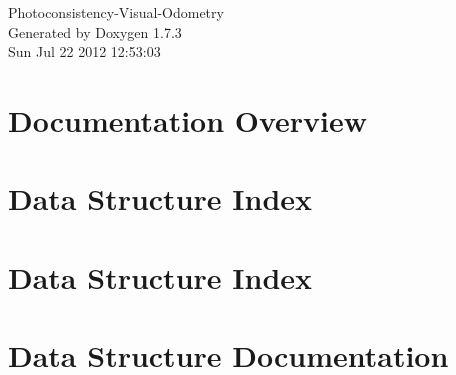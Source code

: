 \documentclass[a4paper]{book}
\begin{document}
\hypersetup{pageanchor=false}
\begin{titlepage}
\vspace*{7cm}
\begin{center}
{\Large Photoconsistency-\/Visual-\/Odometry }\\
\vspace*{1cm}
{\large Generated by Doxygen 1.7.3}\\
\vspace*{0.5cm}
{\small Sun Jul 22 2012 12:53:03}\\
\end{center}
\end{titlepage}
\clearemptydoublepage
{}
\tableofcontents
\clearemptydoublepage
{}
\hypersetup{pageanchor=true}
\chapter{Documentation Overview}
\label{index}\hypertarget{index}{}
\chapter{Data Structure Index}

\chapter{Data Structure Index}

\chapter{Data Structure Documentation}







\printindex
\end{document}
